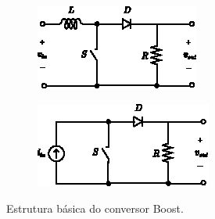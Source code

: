\begin{figure}[h]
  \centering
  \captionsetup{justification=centering}
  \begin{subfigure}[b]{0.33\textwidth}
    \centering
    \includegraphics[width=\textwidth]{figuras/basic_boost_converter_a.eps}
    \caption{}
    \label{fig:basic_boost_converter_a}
  \end{subfigure}%
  \hfil
  \begin{subfigure}[b]{0.37\textwidth}
    \centering
    \includegraphics[width=\textwidth]{figuras/basic_boost_converter_b.eps}
    \caption{}
    \label{fig:basic_boost_converter_b}
  \end{subfigure}
  \caption{Estrutura básica do conversor Boost.}
  \label{fig:boost_converter}
\end{figure}

